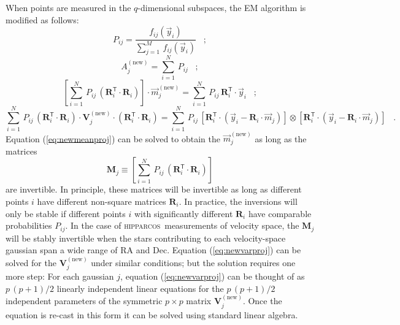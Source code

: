 \documentclass{article}
\newcommand{\hipparcos}{\textsc{hipparcos}}
\begin{document}
When points are measured in the $q$-dimensional subspaces, the EM
algorithm is modified as follows:
\begin{equation}
P_{ij}= \frac{f_{ij}(\vec{y}_i)}{\sum_{j=1}^M\,f_{ij}(\vec{y}_i)} \;\;\; ;
\end{equation}
\begin{equation}
A_j^\mathrm{(new)}= \sum_{i=1}^N\,P_{ij} \;\;\; ;
\end{equation}
\begin{equation}
\label{eq:newmeanproj}
\left[\sum_{i=1}^N\,P_{ij}\,
  (\mathbf{R}_i^\mathsf{T}\cdot\mathbf{R}_i)\right]\cdot
  \vec{m}_j^\mathrm{(new)}= 
  \sum_{i=1}^N\,P_{ij}\,\mathbf{R}_i^\mathsf{T}\cdot\vec{y}_i \;\;\; ;
\end{equation}
\begin{equation}
\label{eq:newvarproj}
\sum_{i=1}^N\,P_{ij}\,(\mathbf{R}_i^\mathsf{T}\cdot\mathbf{R}_i)\cdot
  \mathbf{V}_j^\mathrm{(new)}\cdot
  (\mathbf{R}_i^\mathsf{T}\cdot\mathbf{R}_i)=
  \sum_{i=1}^N\,P_{ij}\,
  \left[\mathbf{R}_i^\mathsf{T}\cdot(\vec{y}_i-\mathbf{R}_i\cdot\vec{m}_j)
  \right]\otimes
  \left[\mathbf{R}_i^\mathsf{T}\cdot(\vec{y}_i-\mathbf{R}_i\cdot\vec{m}_j)
  \right] \;\;\; .
\end{equation}
Equation (\ref{eq:newmeanproj}) can be solved to obtain the
$\vec{m}_j^\mathrm{(new)}$ as long as the matrices
\begin{equation}
\mathbf{M}_j\equiv
  \left[\sum_{i=1}^N\,P_{ij}\,
  (\mathbf{R}_i^\mathsf{T}\cdot\mathbf{R}_i)\right]
\end{equation}
are invertible.  In principle, these matrices will be invertible as
long as different points $i$ have different non-square matrices
$\mathbf{R}_i$.  In practice, the inversions will only be stable if
different points $i$ with significantly different $\mathbf{R}_i$ have
comparable probabilities $P_{ij}$.  In the case of \hipparcos\
measurements of velocity space, the $\mathbf{M}_j$ will be stably
invertible when the stars contributing to each velocity-space gaussian
span a wide range of RA and Dec.  Equation (\ref{eq:newvarproj}) can
be solved for the $\mathbf{V}_j^\mathrm{(new)}$ under similar
conditions; but the solution requires one more step: For each gaussian
$j$, equation (\ref{eq:newvarproj}) can be thought of as $p\,(p+1)/2$
linearly independent linear equations for the $p\,(p+1)/2$ independent
parameters of the symmetric $p\times p$ matrix
$\mathbf{V}_j^\mathrm{(new)}$.  Once the equation is re-cast in this
form it can be solved using standard linear algebra.
\end{document}
